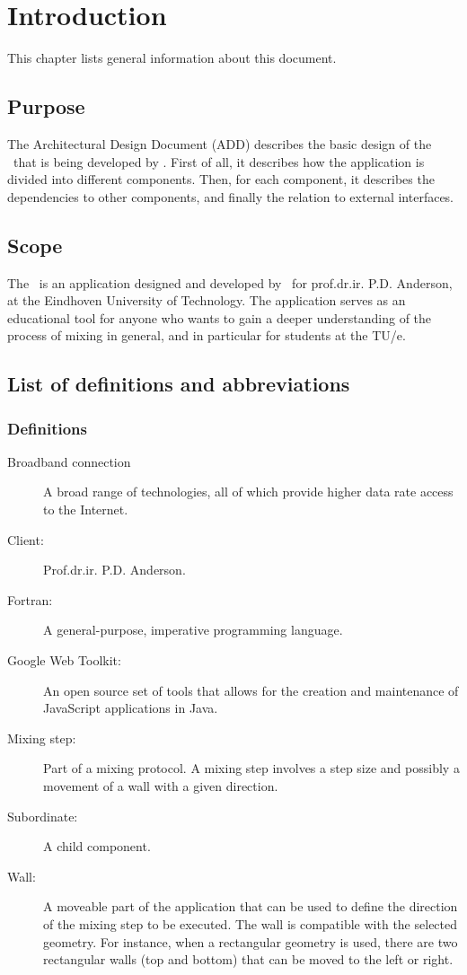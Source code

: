\chapter{Introduction}

This chapter lists general information about this document.

\section{Purpose}
The Architectural Design Document (ADD) describes the basic design of the \applicationname\ that is being developed by \projectauthor. First of all, it describes how the application is divided into different components. Then, for each component, it describes the dependencies to other components, and finally the relation to external interfaces.

\section{Scope}
The \applicationname\ is an application designed and developed by \projectauthor\ for prof.dr.ir. P.D. Anderson, at the Eindhoven University of Technology. The application serves as an educational tool for anyone who wants to gain a deeper understanding of the process of mixing in general, and in particular for students at the TU/e.

\section{List of definitions and abbreviations}
\subsection{Definitions}
\begin{description}
\item[Broadband connection] A broad range of technologies, all of which provide higher data rate access to the Internet.
\item[Client:] Prof.dr.ir. P.D. Anderson.
\item[Fortran:] A general-purpose, imperative programming language.
\item[Google Web Toolkit:] An open source set of tools that allows for the creation and maintenance of JavaScript applications in Java.
\item[Mixing step:] Part of a mixing protocol. A mixing step involves a step size and possibly a movement of a wall with a given direction.
\item[Subordinate:] A child component.
\item[Wall:] A moveable part of the application that can be used to define the direction of the mixing step to be executed. The wall is compatible with the selected geometry. For instance, when a rectangular geometry is used, there are two rectangular walls (top and bottom) that can be moved to the left or right.
\end{description}

